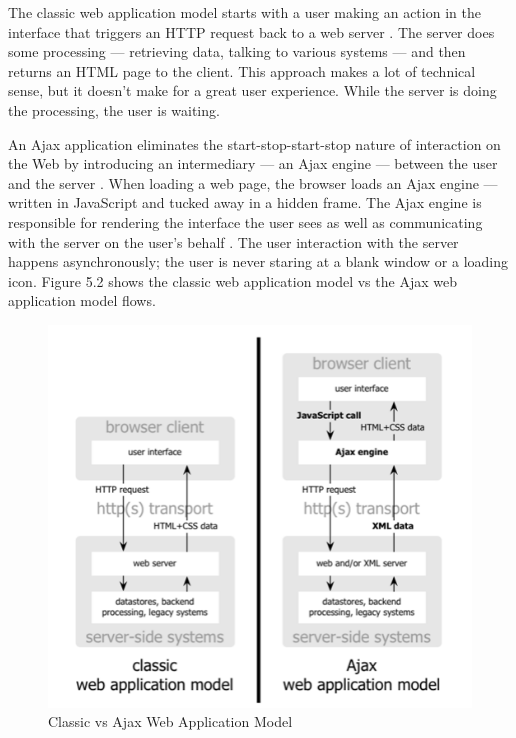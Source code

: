 The classic web application model starts with a user making an action in the interface that triggers an HTTP request back to a web server \cite{garrett2005ajax}. The server does some processing — retrieving data, talking to various systems — and then returns an HTML page to the client. This approach makes a lot of technical sense, but it doesn’t make for a great user experience. While the server is doing the processing, the user is waiting. 

An Ajax application eliminates the start-stop-start-stop nature of interaction on the Web by introducing an intermediary — an Ajax engine — between the user and the server \cite{garrett2005ajax}. When loading a web page, the browser loads an Ajax engine — written in JavaScript and tucked away in a hidden frame. The Ajax engine is responsible for rendering the interface the user sees as well as communicating with the server on the user’s behalf \cite{garrett2005ajax,AJAX}. The user interaction with the server happens asynchronously; the user is never staring at a blank window or a loading icon. Figure 5.2 shows the classic web application model vs the Ajax web application model flows.
\begin{figure}[H]
\centering
\includegraphics[scale=0.5]{Images/Ajax.png}
\caption[Classic vs Ajax Web Application Model]{Classic vs Ajax Web Application Model \cite{garrett2005ajax}}
\end{figure}
